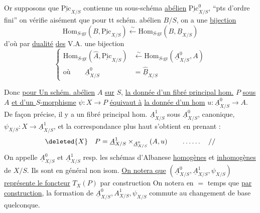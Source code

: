 Or supposons que $\underline{\mathrm{Pic}}_{X/S}$ contienne un sous-schéma
   \uline{abélien} $\underline{\mathrm{Pic}}^0_{X/S}$,    
``pts d'ordre fini''
on vérifie aisément que pour tt schém. abélien $B/S$, on
a une \uline{bijection}
\[
\mathrm{Hom}_{S\text{-gr}}(B,\underline{\mathrm{Pic}}_{X/S})\xleftarrow{\sim}\mathrm{Hom}_{S\text{-gr}}(B,\underline B_{X/S})
\]
d'où par \uline{dualité} \uline{des} V.A. une bijection
\[
\left\{\begin{aligned}
\mathrm{Hom}_{S\text{-gr}}(\widehat A,\underline{\mathrm{Pic}}_{X/S})&\xleftarrow{\sim}\mathrm{Hom}_{S\text{-gr}}(\underline A^0_{X/S},A)\\
\text{où}\qquad \underline A^0_{X/S}&=\widehat{\underline B}_{X/S}
\end{aligned}\right.
\]

Donc \uline{pour Un schém. abélien} $A$ \uline{sur} $S$, 
\uline{la donnée d'un fibré principal hom.} $P$ \uline{sous} $A$
\uline{et d'un $S$-morphisme} $\psi:X\longrightarrow P$ \uline{équivaut  à}
\uline{la donnée d'un hom}  $u:\underline A^0_{X/S}\longrightarrow A$. De façon
précise, il y a un fibré principal hom.
$\underline A^1_{X/S}$ sous $\underline A^0_{X/S}$, canonique,  
  $\psi_{X/S}:X\longrightarrow\underline A^1_{X/S}$, et la correspondance
 plus haut s'obtient en prenant :
\[
\deleted{X} \quad P=\underline A^1_{X/S}\times_{\underline A^0_{X/S}}(A,u)\qquad \ldots\ldots\quad //
\]
On appelle
$\underline A^0_{X/S}$ et $\underline A^1_{X/S}$ resp. les schémas d'Albanese
\uline{homogènes} et \uline{inhomogènes} de $X/S$. Ils sont
en général non isom. \uline{On notera que}
$(\underline A^0_{X/S},\underline A^1_{X/S},\psi_{X/S})$ \uline{représente le foncteur} $T_X(P)$ par construction
On notera en $=$ temps que \uline{par construction}, 
la formation de $\underline A^0_{X/S},A^1_{X/S},\psi_{X/S}$ commute au
changement de base quelconque.

